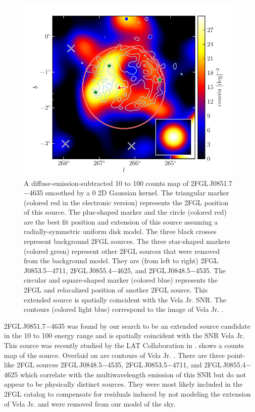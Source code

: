 \begin{figure}[htbp]
  \includegraphics{source_plots/source_Vela_Jr_color.pdf}
  \caption{A diffuse-emission-subtracted 10 \gev to 100 \gev counts map
  of 2FGL\,J0851.7$-$4635 smoothed by a 0 2D Gaussian kernel. The
  triangular marker (colored red in the electronic version) represents the
  2FGL position of this source.  The plus-shaped marker and the circle
  (colored red) are the best fit position and extension of this source
  assuming a radially-symmetric uniform disk model.  The three black
  crosses represent background 2FGL sources.  The three star-shaped
  markers (colored green) represent other 2FGL sources that were
  removed from the background model.  They are (from left to right)
  2FGL\,J0853.5$-$4711, 2FGL\,J0855.4$-$4625, and 2FGL\,J0848.5$-$4535.
  The circular and square-shaped marker (colored blue) represents the
  2FGL and relocalized position of another 2FGL source.  This extended
  source is spatially coincident with the Vela Jr. SNR.  The contours
  (colored light blue) correspond to the \tev image of Vela Jr.
  \citep{aharonian_2007a_h.e.s.s.-observations}.}
\end{figure}

2FGL\,J0851.7$-$4635 was found by our search to be an extended source
candidate in the 10 \gev to 100 \gev energy range and is spatially
coincident with the SNR Vela Jr. This source was recently studied by
the LAT Collaboration in \cite{tanaka_2011a_gamma-ray-observations}.
 shows a counts map of the source.
Overlaid on  are \tev contours of Vela
Jr. \citep{aharonian_2007a_h.e.s.s.-observations}.  There are three
point-like 2FGL sources 2FGL\,J0848.5$-$4535, 2FGL\,J0853.5$-$4711, and
2FGL\,J0855.4$-$4625 which correlate with the multiwavelength emission of
this SNR but do not appear to be physically distinct sources.  They were
most likely included in the 2FGL catalog to compensate for residuals
induced by not modeling the extension of Vela Jr. and were removed from
our model of the sky.

